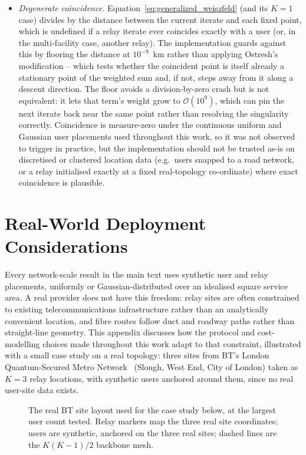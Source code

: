 \documentclass[12pt]{article}
\let\oldsection\section
\renewcommand{\section}{\clearpage\oldsection}
\begin{document}
\begin{itemize}
    \item \textit{Degenerate coincidence.} Equation~\ref{eq:generalized_weiszfeld} (and its $K=1$ case) divides by the distance between the current iterate and each fixed point, which is undefined if a relay iterate ever coincides exactly with a user (or, in the multi-facility case, another relay). The implementation guards against this by flooring the distance at $10^{-9}$~km rather than applying Ostresh's modification -- which tests whether the coincident point is itself already a stationary point of the weighted sum and, if not, steps away from it along a descent direction. The floor avoids a division-by-zero crash but is not equivalent: it lets that term's weight grow to $\mathcal{O}(10^{9})$, which can pin the next iterate back near the same point rather than resolving the singularity correctly. Coincidence is measure-zero under the continuous uniform and Gaussian user placements used throughout this work, so it was not observed to trigger in practice, but the implementation should not be trusted as-is on discretised or clustered location data (e.g.\ users snapped to a road network, or a relay initialised exactly at a fixed real-topology co-ordinate) where exact coincidence is plausible.
\end{itemize}

\section{Real-World Deployment Considerations}
\label{sec:appendix_bt}

Every network-scale result in the main text uses synthetic user and relay placements, uniformly or Gaussian-distributed over an idealised square service area. A real provider does not have this freedom: relay sites are often constrained to existing telecommunications infrastructure rather than an analytically convenient location, and fibre routes follow duct and roadway paths rather than straight-line geometry. This appendix discusses how the protocol and cost-modelling choices made throughout this work adapt to that constraint, illustrated with a small case study on a real topology: three sites from BT's London Quantum-Secured Metro Network~\cite{Lord_2023} (Slough, West End, City of London) taken as $K=3$ relay locations, with synthetic users anchored around them, since no real user-site data exists.

\begin{figure}[hbtp]
    \centering
    \resizebox{0.85\textwidth}{!}{}
    \caption{The real BT site layout used for the case study below, at the largest user count tested. Relay markers map the three real site coordinates; users are synthetic, anchored on the three real sites; dashed lines are the $K(K-1)/2$ backbone mesh.}
    \label{fig:bt_topology}
\end{figure}
\end{document}

